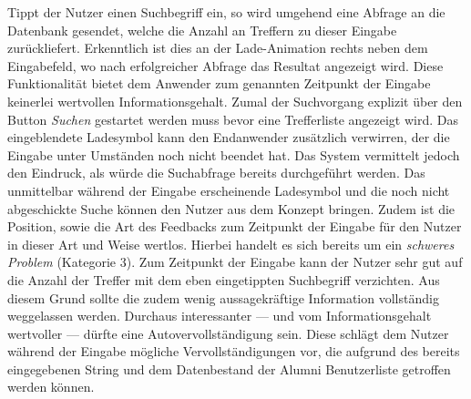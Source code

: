 {
	Tippt der Nutzer einen Suchbegriff ein, so wird umgehend eine Abfrage an die Datenbank gesendet, welche die Anzahl an Treffern zu dieser Eingabe zurückliefert. Erkenntlich ist dies an der Lade-Animation rechts neben dem Eingabefeld, wo nach erfolgreicher Abfrage das Resultat angezeigt wird. Diese Funktionalität bietet dem Anwender zum genannten Zeitpunkt der Eingabe keinerlei wertvollen Informationsgehalt. Zumal der Suchvorgang explizit über den Button \emph{Suchen} gestartet werden muss bevor eine Trefferliste angezeigt wird. Das eingeblendete Ladesymbol kann den Endanwender zusätzlich verwirren, der die Eingabe unter Umständen noch nicht beendet hat. Das System vermittelt jedoch den Eindruck, als würde die Suchabfrage bereits durchgeführt werden.}
{
	Das unmittelbar während der Eingabe erscheinende Ladesymbol und die noch nicht abgeschickte Suche können den Nutzer aus dem Konzept bringen. Zudem ist die Position, sowie die Art des Feedbacks zum Zeitpunkt der Eingabe für den Nutzer in dieser Art und Weise wertlos. Hierbei handelt es sich bereits um ein \emph{schweres Problem} (Kategorie 3).
}
{
	Zum Zeitpunkt der Eingabe kann der Nutzer sehr gut auf die Anzahl der Treffer mit dem eben eingetippten Suchbegriff verzichten. Aus diesem Grund sollte die zudem wenig aussagekräftige Information vollständig weggelassen werden. Durchaus interessanter --- und vom Informationsgehalt wertvoller --- dürfte eine Autovervollständigung sein. Diese schlägt dem Nutzer während der Eingabe mögliche Vervollständigungen vor, die aufgrund des bereits eingegebenen String und dem Datenbestand der Alumni Benutzerliste getroffen werden können.
} 
\label{prob:suche:trefferanzeige}

